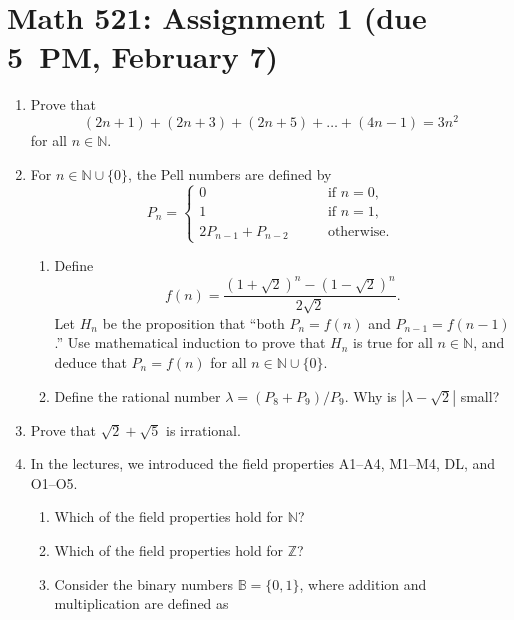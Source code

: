 \documentclass[12pt]{article}
\newcommand{\N}{\mathbb{N}}
\newcommand{\B}{\mathbb{B}}
\newcommand{\Z}{\mathbb{Z}}
\begin{document}
\section*{Math 521: Assignment 1 (due 5~PM, February 7)}
\begin{enumerate}
  \item Prove that
    \begin{equation}
      (2n+1) + (2n+3) + (2n+5) + \ldots + (4n-1) = 3n^2
    \end{equation}
    for all $n\in \N$.
  \item For $n\in \N\cup\{0\}$, the Pell numbers are defined by
    \begin{equation}
      P_n= \begin{cases}
      0 & \qquad \text{if $n=0$,} \\
      1 & \qquad \text{if $n=1$,} \\
        2P_{n-1} + P_{n-2} & \qquad \text{otherwise.}
      \end{cases}
    \end{equation}
    \begin{enumerate}
      \item Define
        \begin{equation}
          f(n) = \frac{(1+\sqrt2)^n - (1-\sqrt2)^n}{2\sqrt2}.
        \end{equation}
        Let $H_n$ be the proposition that ``both $P_n=f(n)$ and
        $P_{n-1}=f(n-1)$.'' Use mathematical induction to prove that $H_n$ is
        true for all $n\in \N$, and deduce that $P_n =f(n)$ for all $n\in \N
        \cup\{0\}$.
      \item Define the rational number $\lambda = (P_8+P_9)/P_9$. Why is
        $|\lambda - \sqrt{2}|$ small?
    \end{enumerate}
  \item Prove that $\sqrt2+\sqrt5$ is irrational.
  \item In the lectures, we introduced the field properties A1--A4, M1--M4, DL,
    and O1--O5.
    \begin{enumerate}
      \item Which of the field properties hold for $\N$?
      \item Which of the field properties hold for $\Z$?
      \item Consider the binary numbers $\B=\{0,1\}$, where addition and multiplication
        are defined as
        \begin{center}
          \begin{tabular}{lll}

\end{tabular}
\end{center}
\end{enumerate}
\end{enumerate}
\end{document}
